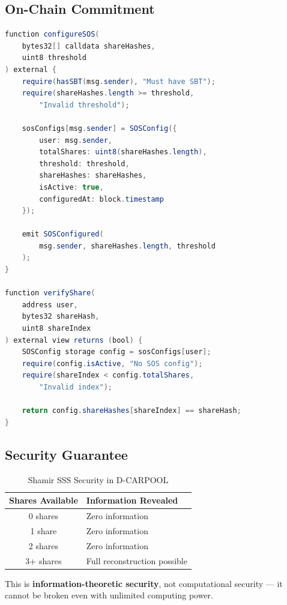 \documentclass[12pt]{report}
\theoremstyle{plain}
\theoremstyle{definition}
\theoremstyle{remark}
\begin{document}
\subsection{On-Chain Commitment}

\begin{lstlisting}[language=Java, caption=ShamirSOSVault Contract]
function configureSOS(
    bytes32[] calldata shareHashes,
    uint8 threshold
) external {
    require(hasSBT(msg.sender), "Must have SBT");
    require(shareHashes.length >= threshold, 
        "Invalid threshold");
    
    sosConfigs[msg.sender] = SOSConfig({
        user: msg.sender,
        totalShares: uint8(shareHashes.length),
        threshold: threshold,
        shareHashes: shareHashes,
        isActive: true,
        configuredAt: block.timestamp
    });
    
    emit SOSConfigured(
        msg.sender, shareHashes.length, threshold
    );
}

function verifyShare(
    address user,
    bytes32 shareHash,
    uint8 shareIndex
) external view returns (bool) {
    SOSConfig storage config = sosConfigs[user];
    require(config.isActive, "No SOS config");
    require(shareIndex < config.totalShares, 
        "Invalid index");
    
    return config.shareHashes[shareIndex] == shareHash;
}
\end{lstlisting}

\subsection{Security Guarantee}

\begin{table}[H]
\centering
\caption{Shamir SSS Security in D-CARPOOL}
\begin{tabular}{|c|p{8cm}|}
\hline
\textbf{Shares Available} & \textbf{Information Revealed} \\
\hline
0 shares & Zero information \\
1 share & Zero information \\
2 shares & Zero information \\
3+ shares & Full reconstruction possible \\
\hline
\end{tabular}
\end{table}

This is \textbf{information-theoretic security}, not computational security — it cannot be broken even with unlimited computing power.
\end{document}

